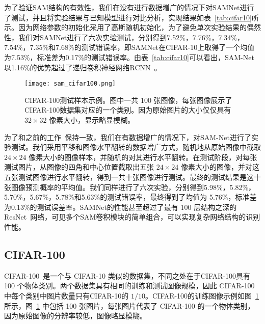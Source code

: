为了验证SAM结构的有效性，我们在没有进行数据増广的情况下对SAMNet进行了测试，并且将实验结果与已知模型进行对比分析，实现结果如表~\ref{tab:cifar10}所示。因为网络参数的初始化采用了高斯随机初始化，为了避免单次实验结果的偶然性，我们对SAMNet进行了六次实验测试，分别得到7.52\%，7.76\%，7.34\%，7.54\%，7.35\%和7.68\%的测试错误率，即SAMNet在CIFAR-10上取得了一个均值为7.53\%，标准差为0.17\%的测试错误率。由表~\ref{tab:cifar10}可以看出，SAM-Net以1.16\%的优势超过了递归卷积神经网络RCNN~\cite{liang2015recurrent}。

\begin{figure}[!h]
\centering
\texttt{[image: sam\_cifar100.png]}
\caption{CIFAR-100测试样本示例。图中一共 100 张图像，每张图像展示了CIFAR-100数据集对应的一个类别。因为原始图片的大小仅仅具有$32\times32$ 像素大小，显示略显模糊。}
\label{fig:sam_cifar100}
\end{figure}


为了和之前的工作~\cite{goodfellow2013maxout,springenberg2013improving,stollenga2014deep,wan2013regularization,DBLP:journals/corr/LinCY13,lee2014deeply,liang2015recurrent,srivastava2015training,springenberg2014striving}保持一致，我们在有数据增广的情况下，对SAM-Net进行了实验测试。我们采用平移和图像水平翻转的数据增广方式，随机地从原始图像中截取 $24\times24$ 像素大小的图像样本，并随机的对其进行水平翻转。在测试阶段，对每张测试图片，从图像的四角和中心位置截取出五张 $24\times24$ 像素大小的图像，并对这五张测试图像进行水平翻转，得到一共十张图像进行测试。最终的测试结果是这十张图像预测概率的平均值。我们同样进行了六次实验，分别得到5.98\%，5.82\%，5.70\%，5.67\%，5.78\%和5.63\%的测试错误率，最终得到了均值为 5.76\%，标准差为0.13\%的测试误差率。SAMNet的性能甚至超过了最有 100 层结构之深的ResNet~\cite{he2015deep}网络，可见多个SAM卷积模块的简单组合，可以实现复杂网络结构的识别性能。



\subsection{CIFAR-100}
\label{sec:sap:experiment:cifar100}



CIFAR-100~\cite{krizhevsky2009learning}是一个与 CIFAR-10 类似的数据集，不同之处在于CIFAR-100具有 100 个物体类别。两个数据集具有相同的训练和测试图像规模，因此 CIFAR-100 中每个类别中图片数量只有CIFAR-10的 $1/10$。CIFAR-100的训练图像示例如图~\ref{fig:sam_cifar100} 所示，图~\ref{fig:sam_cifar100} 中包括 100 张图片，每张图片代表了 CIFAR-100 的一个物体类别，因为原始图像的分辨率较低，图像略显模糊。

